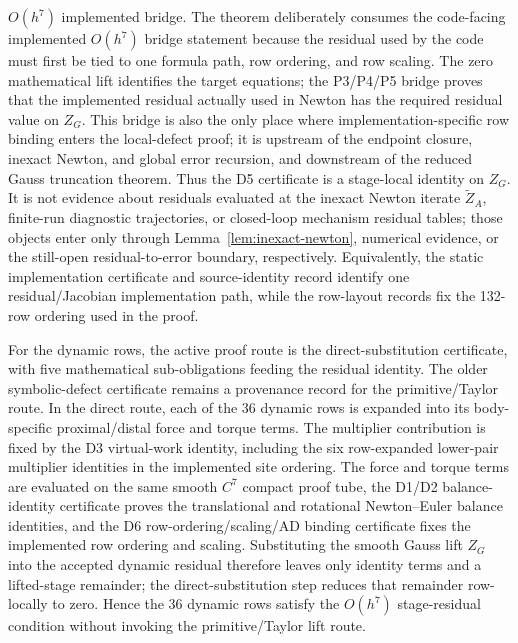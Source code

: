 \documentclass[preprint,12pt]{elsarticle}
\begin{document}
\(O(h^7)\) implemented bridge.  The theorem deliberately consumes the
code-facing implemented \(O(h^7)\) bridge statement because the residual used
by the code must first be tied to
one formula path, row ordering, and row scaling.  The zero mathematical lift
identifies the target equations; the P3/P4/P5 bridge proves that the
implemented residual actually used in Newton has the required residual value
on \(Z_G\).  This bridge is also the only place where implementation-specific
row binding enters the local-defect proof; it is upstream of the endpoint
closure, inexact Newton, and global error recursion, and downstream of the
reduced Gauss truncation theorem.
Thus the D5 certificate is a stage-local identity on \(Z_G\). It is not evidence about residuals evaluated at the inexact Newton iterate
\(\widetilde Z_A\), finite-run diagnostic trajectories, or closed-loop
mechanism residual tables; those objects enter only through
Lemma~\ref{lem:inexact-newton}, numerical evidence, or the still-open residual-to-error boundary, respectively.
Equivalently, the static implementation certificate and source-identity
record identify one residual/Jacobian implementation path, while the
row-layout records fix the 132-row ordering used in the proof.

For the dynamic rows, the active proof route is the direct-substitution
certificate, with five mathematical sub-obligations feeding the residual
identity. The older symbolic-defect certificate remains a provenance record
for the primitive/Taylor route.  In the direct route, each of the 36 dynamic
rows is expanded into its body-specific proximal/distal force and torque
terms. The multiplier contribution is fixed by the D3 virtual-work identity,
including the six row-expanded lower-pair multiplier identities in the
implemented site ordering. The force and torque terms are evaluated on the
same smooth $C^7$ compact proof tube, the D1/D2 balance-identity certificate proves
the translational and rotational Newton--Euler balance identities, and the D6
row-ordering/scaling/AD binding certificate fixes the implemented row ordering and
scaling.  Substituting the smooth Gauss lift \(Z_G\) into the accepted dynamic
residual therefore leaves only identity terms and a lifted-stage remainder;
the direct-substitution step reduces that remainder row-locally to zero.
Hence the 36 dynamic rows satisfy the \(O(h^7)\) stage-residual condition
without invoking the primitive/Taylor lift route.
\end{document}
